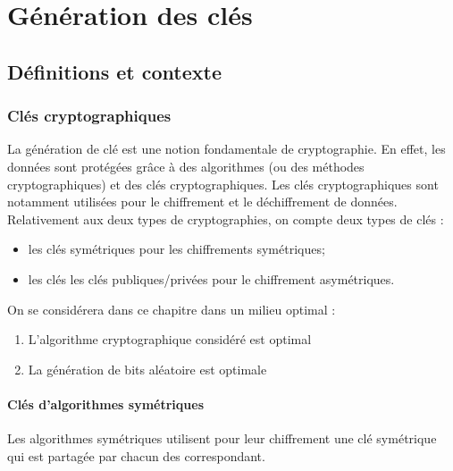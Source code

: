 \chapter{Génération des clés}
\section{Définitions et contexte}

\subsection{Clés cryptographiques}

La génération de clé est une notion fondamentale de cryptographie. En effet, les données sont protégées grâce à des algorithmes (ou des méthodes cryptographiques) et des clés cryptographiques. Les clés cryptographiques sont notamment utilisées pour le chiffrement et le déchiffrement de données. 
Relativement aux deux types de cryptographies, on compte deux types de clés : 
\begin{itemize}
\item les clés symétriques pour les chiffrements symétriques;
\item les clés les clés publiques/privées pour le chiffrement asymétriques.\\
\end{itemize}

On se considérera dans ce chapitre dans un milieu optimal : 
\begin{enumerate}
\item L'algorithme cryptographique considéré est optimal
\item La génération de bits aléatoire est optimale
\end{enumerate}


\subsubsection{Clés d'algorithmes symétriques}
Les algorithmes symétriques utilisent pour leur chiffrement une clé symétrique qui est partagée par chacun des correspondant. 

